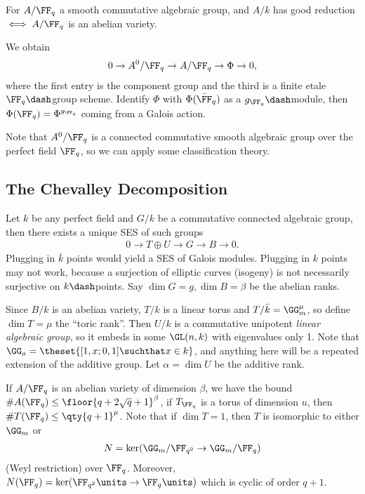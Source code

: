 For \(A/\FF_q\) a smooth commutative algebraic group, and \(A/k\) has
good reduction \(\iff A/\FF_q\) is an abelian variety.

We obtain
\begin{align*}
0 \to A^0/\FF_q \to A/\FF_q \to \Phi \to 0
,\end{align*} where the first entry is the component group and the third
is a finite etale \(\FF_q\dash\)group scheme. Identify \(\Phi\) with
\(\Phi(\bar \FF_q)\) as a \(g_{\FF_q}\dash\)module, then
\(\Phi(\FF_q) = \Phi^{g_{\FF_q}}\) coming from a Galois action.

Note that \(A^0/\FF_q\) is a connected commutative smooth algebraic
group over the perfect field \(\FF_q\), so we can apply some
classification theory.

\hypertarget{the-chevalley-decomposition}{%
\subsection{The Chevalley
Decomposition}\label{the-chevalley-decomposition}}

Let \(k\) be any perfect field and \(G/k\) be a commutative connected
algebraic group, then there exists a unique SES of such groups
\begin{align*}
0 \to T\oplus U\to G \to B \to 0
.\end{align*} Plugging in \(\bar k\) points would yield a SES of Galois
modules. Plugging in \(k\) points may not work, because a surjection of
elliptic curves (isogeny) is not necessarily surjective on
\(k\dash\)points. Say \(\dim G= g, \dim B = \beta\) be the abelian
ranks.

Since \(B/k\) is an abelian variety, \(T/k\) is a linear torus and
\(T/\bar k = \GG_m^\mu\), so define \(\dim T = \mu\) the ``toric rank''.
Then \(U/k\) is a commutative unipotent \emph{linear algebraic group},
so it embeds in some \(\GL(n, k)\) with eigenvalues only 1. Note that
\(\GG_a = \theset{ [1, x; 0, 1] \suchthat x\in k}\), and anything here
will be a repeated extension of the additive group. Let
\(\alpha = \dim U\) be the additive rank.

If \(A/\FF_q\) is an abelian variety of dimension \(\beta\), we have the
bound \(\# A(\FF_q) \leq \floor{ q + 2\sqrt q + 1 }^\beta\), if
\(T_{\FF_q}\) is a torus of dimension \(u\), then
\(\# T(\FF_q) \leq \qty{q+1}^\mu\). Note that if \(\dim T = 1\), then
\(T\) is isomorphic to either \(\GG_m\) or
\begin{align*}N = \ker( \GG_m/\FF_{q^2} \to \GG_m/\FF_q  )\end{align*}
(Weyl restriction) over \(\FF_q\). Moreover,
\(N(\FF_q) = \ker(\FF_{q^2}\units \to \FF_q\units)\) which is cyclic of
order \(q+1\).

